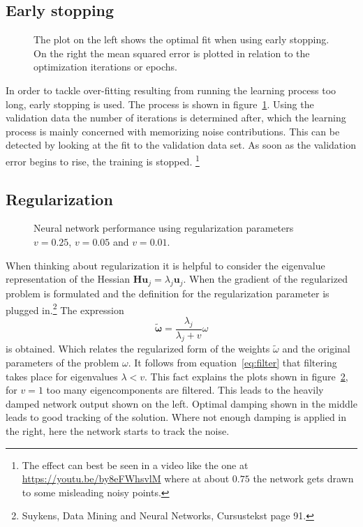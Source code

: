\subsection{Early stopping}
\begin{figure}
\centering


\caption{The plot on the left shows the optimal fit when using early stopping. On the right the mean squared error is plotted in relation to the optimization iterations or epochs.}
\label{fig:noisyCase5}
\end{figure}
In order to tackle over-fitting resulting from running the learning process too long, early stopping is used. The process is shown in figure~\ref{fig:noisyCase5}. Using the validation data the number of iterations is determined after, which the learning process is mainly concerned with memorizing noise contributions. This can be detected by looking at the fit to the validation data set. As soon as the validation error begins to rise, the training is stopped. \footnote{The effect can best be seen in a video like the one at \url{https://youtu.be/by8eFWhsvlM} where at about $0.75$ the network gets drawn to some misleading noisy points.}

\subsection{Regularization}
\begin{figure}
\centering



\caption{Neural network performance using regularization parameters $v = 0.25$, $v = 0.05$ and $v = 0.01$.}
\label{fig:noisyCase6}
\end{figure}
When thinking about regularization it is helpful to consider the eigenvalue representation of the Hessian $\mathbf{Hu}_j = \lambda_j \mathbf{u}_j$. When the gradient of the regularized problem is formulated and the definition for the regularization parameter is plugged in.\footnote{Suykens, Data Mining and Neural Networks, Cursustekst page 91.} The expression 
\begin{equation}
\tilde{\mathbf{\omega}} = \frac{\lambda_j}{\lambda_j + v}\omega
\label{eq:filter}
\end{equation}
is obtained. Which relates the regularized form of the weights $\tilde{\omega}$ and the original parameters of the problem $\omega$. It follows from equation~\ref{eq:filter} that filtering takes place for eigenvalues $\lambda < v$. This fact explains the plots shown in figure~\ref{fig:noisyCase6}, for $v = 1$ too many eigencomponents are filtered. This leads to the heavily damped network output shown on the left. Optimal damping shown in the middle leads to good tracking of the solution. Where not enough damping is applied in the right, here the network starts to track the noise.

